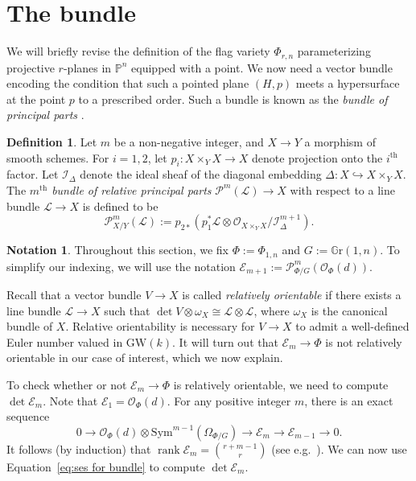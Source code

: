 \documentclass[12pt]{amsart}
\numberwithin{equation}{section}
\theoremstyle{plain}
\theoremstyle{definition}
\newtheorem{defn}[thm]{Definition}
\newtheorem{notn}[thm]{Notation}
\newcommand{\mb}[1]{\mathbb{#1}}
\newcommand{\mc}[1]{\mathcal{#1}}
\newcommand{\GW}{\mathrm{GW}}
\newcommand{\PGr}{\mathbb{G}\mathrm{r}}
\newcommand{\rank}{\operatorname{rank}}
\newcommand{\Sym}{\mathrm{Sym}}
\begin{document}
\section{The bundle}\label{sec:bundle}
We will briefly revise the definition of 
the flag variety $\Phi_{r,n}$ parameterizing projective $r$-planes in $\mb{P}^n$ equipped with a point. We now need a vector bundle encoding the condition that such a pointed plane $(H,p)$ meets a hypersurface at the point $p$ to a prescribed order. Such a bundle is known as the \emph{bundle of principal parts} \cite[D\'efinition (16.3.1)]{MR238860}.
\begin{defn}\label{defn:pp_forPhi}
    Let $m$ be a non-negative integer, and $X\rightarrow Y$ a morphism of smooth schemes. For $i=1,2$, let $p_i\colon X\times_YX\to X$ denote projection onto the $i^\text{th}$ factor. Let $\mc{I}_\Delta$ denote the ideal sheaf of the diagonal embedding $\Delta\colon X\hookrightarrow X\times_YX$. The \emph{$m^\text{th}$ bundle of relative principal parts} $\mc{P}^m(\mathcal{L})\to X$ with respect to a line bundle $\mathcal{L}\rightarrow X$   is defined to be
    \[\mc{P}_{X/Y}^m(\mathcal{L}):=p_{2*}(p_1^*\mathcal{L}\otimes\mc{O}_{X\times_YX}/\mc{I}^{m+1}_\Delta).\]
\end{defn}
\begin{notn}
    Throughout this section, we fix $\Phi:=\Phi_{1,n}$ and $G:=\PGr(1,n)$. To simplify our indexing, we will use the notation $\mc{E}_{m+1}:=\mc{P}_{\Phi/G}^m(\mc{O}_\Phi(d))$.
\end{notn}

Recall that a vector bundle $V\to X$ is called \emph{relatively orientable} if there exists a line bundle $\mc{L}\to X$ such that $\det{V}\otimes\omega_X\cong\mc{L}\otimes\mc{L}$, where $\omega_X$ is the canonical bundle of $X$. Relative orientability is necessary for $V\to X$ to admit a well-defined Euler number valued in $\GW(k)$. It will turn out that $\mc{E}_m\to\Phi$ is not relatively orientable in our case of interest, which we now explain.

To check whether or not $\mc{E}_m\to\Phi$ is relatively orientable, we need to compute $\det\mc{E}_m$. Note that $\mc{E}_1=\mc{O}_\Phi(d)$. For any positive integer $m$, there is an exact sequence
\begin{equation}\label{eq:ses for bundle}
0\longrightarrow\mc{O}_\Phi(d)\otimes\Sym^{m-1}(\Omega_{\Phi/G})\longrightarrow\mc{E}_m\longrightarrow\mc{E}_{m-1}\longrightarrow 0.
\end{equation}
It follows (by induction) that $\rank\mc{E}_m=\binom{r+m-1}{r}$ (see e.g.~\cite[(3.5) Proposition]{MR0626480}). We can now use Equation~\ref{eq:ses for bundle} to compute $\det\mc{E}_m$.
\end{document}
